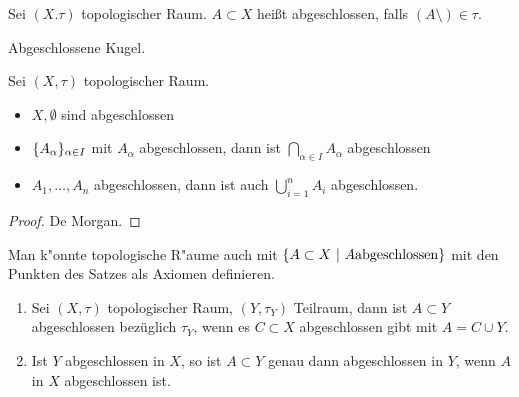 \begin{dfn}
    Sei $(X. \tau)$ topologischer Raum. $A\subset X$ hei\ss{}t abgeschlossen,
    falls $(A\setminus)\in\tau$.
\end{dfn}

\begin{bsp}
    Abgeschlossene Kugel.
\end{bsp}

\begin{stz}[Dualsatz]
    Sei $(X,\tau)$ topologischer Raum.
    \begin{itemize}
        \item $X, \emptyset$ sind abgeschlossen
        \item $\mdef{A_\alpha}_{\alpha\in I}$ mit $A_\alpha$ abgeschlossen, dann ist
            $\bigcap_{\alpha\in I} A_\alpha$ abgeschlossen
        \item $A_1,\ldots, A_n$ abgeschlossen, dann ist auch $\bigcup_{i=1}^n A_i$
            abgeschlossen.
    \end{itemize}
    \begin{proof}
        De Morgan.
    \end{proof}
    \begin{bem}
        Man k"onnte topologische R"aume auch mit $\mdef[A\subset X]{A\mathrm{
        abgeschlossen}}$ mit den Punkten des Satzes als Axiomen definieren.
    \end{bem}
\end{stz}

\begin{lem}
    \begin{enumerate}
        \item Sei $(X,\tau)$ topologischer Raum, $(Y,\tau_Y)$ Teilraum, dann ist
            $A\subset Y$ abgeschlossen bezüglich $\tau_Y$, wenn es $C\subset X$
            abgeschlossen gibt mit $A=C\cup Y$.
        \item Ist $Y$ abgeschlossen in $X$, so ist $A\subset Y$ genau dann abgeschlossen
            in $Y$, wenn $A$ in $X$ abgeschlossen ist.
    \end{enumerate}
\end{lem}

